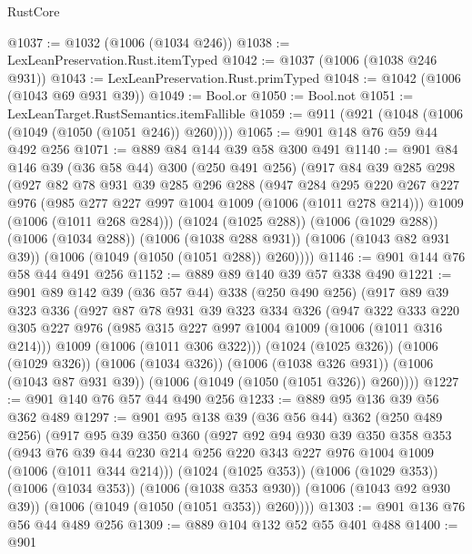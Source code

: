\begin{lexlean}{RustCore}
\begin{coremodule}
{\begin{coremodule}
{{{{{@1037 := @1032 (@1006 (@1034 @246))
@1038 := LexLeanPreservation.Rust.itemTyped
@1042 := @1037 (@1006 (@1038 @246 @931))
@1043 := LexLeanPreservation.Rust.primTyped
@1048 := @1042 (@1006 (@1043 @69 @931 @39))
@1049 := Bool.or
@1050 := Bool.not
@1051 := LexLeanTarget.RustSemantics.itemFallible
@1059 := @911 (@921 (@1048 (@1006 (@1049 (@1050 (@1051 @246)) @260))))
@1065 := @901 @148 @76 @59 @44 @492 @256
@1071 := @889 @84 @144 @39 @58 @300 @491
@1140 := @901
    @84
    @146
    @39
    (@36 @58 @44)
    @300
    (@250 @491 @256)
    (@917
      @84
      @39
      @285
      @298
      (@927
        @82
        @78
        @931
        @39
        @285
        @296
        @288
        (@947
          @284
          @295
          @220
          @267
          @227
          @976
          (@985 @277 @227 @997 @1004 @1009 (@1006 (@1011 @278 @214)))
          @1009
          (@1006 (@1011 @268 @284)))
        (@1024 (@1025 @288))
        (@1006 (@1029 @288))
        (@1006 (@1034 @288))
        (@1006 (@1038 @288 @931))
        (@1006 (@1043 @82 @931 @39))
        (@1006 (@1049 (@1050 (@1051 @288)) @260))))
@1146 := @901 @144 @76 @58 @44 @491 @256
@1152 := @889 @89 @140 @39 @57 @338 @490
@1221 := @901
    @89
    @142
    @39
    (@36 @57 @44)
    @338
    (@250 @490 @256)
    (@917
      @89
      @39
      @323
      @336
      (@927
        @87
        @78
        @931
        @39
        @323
        @334
        @326
        (@947
          @322
          @333
          @220
          @305
          @227
          @976
          (@985 @315 @227 @997 @1004 @1009 (@1006 (@1011 @316 @214)))
          @1009
          (@1006 (@1011 @306 @322)))
        (@1024 (@1025 @326))
        (@1006 (@1029 @326))
        (@1006 (@1034 @326))
        (@1006 (@1038 @326 @931))
        (@1006 (@1043 @87 @931 @39))
        (@1006 (@1049 (@1050 (@1051 @326)) @260))))
@1227 := @901 @140 @76 @57 @44 @490 @256
@1233 := @889 @95 @136 @39 @56 @362 @489
@1297 := @901
    @95
    @138
    @39
    (@36 @56 @44)
    @362
    (@250 @489 @256)
    (@917
      @95
      @39
      @350
      @360
      (@927
        @92
        @94
        @930
        @39
        @350
        @358
        @353
        (@943 @76 @39 @44 @230 @214 @256 @220 @343 @227 @976 @1004 @1009 (@1006 (@1011 @344 @214)))
        (@1024 (@1025 @353))
        (@1006 (@1029 @353))
        (@1006 (@1034 @353))
        (@1006 (@1038 @353 @930))
        (@1006 (@1043 @92 @930 @39))
        (@1006 (@1049 (@1050 (@1051 @353)) @260))))
@1303 := @901 @136 @76 @56 @44 @489 @256
@1309 := @889 @104 @132 @52 @55 @401 @488
@1400 := @901
}}}}}
\end{coremodule}}
\end{coremodule}
\end{lexlean}

